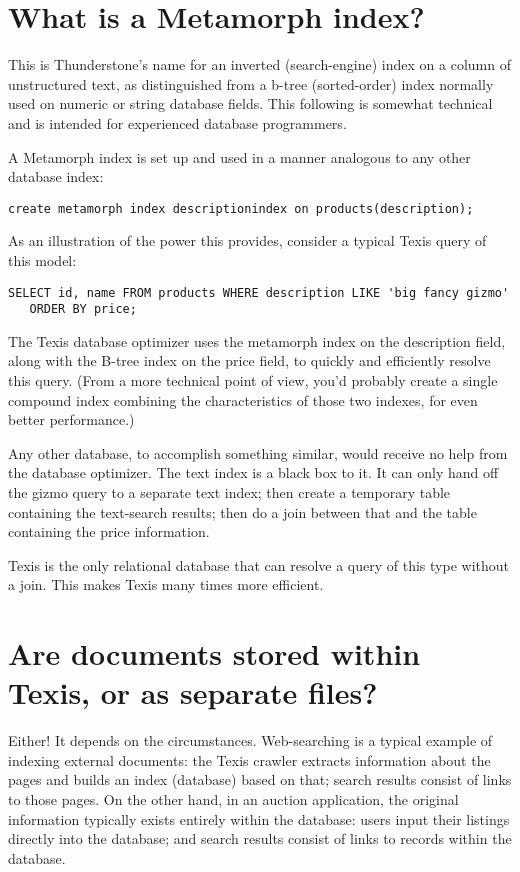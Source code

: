 \section{What is a Metamorph index? }

This is Thunderstone's name for an inverted (search-engine) index on a
column of unstructured text, as distinguished from a b-tree
(sorted-order) index normally used on numeric or string database
fields.  This following is somewhat technical and is intended for
experienced database programmers.

A Metamorph index is set up and used in a manner analogous to any
other database index:

\begin{verbatim}
create metamorph index descriptionindex on products(description);
\end{verbatim}

As an illustration of the power this provides, consider a typical
Texis query of this model:

\begin{verbatim}
SELECT id, name FROM products WHERE description LIKE 'big fancy gizmo'
   ORDER BY price;
\end{verbatim}

The Texis database optimizer uses the metamorph index on the
description field, along with the B-tree index on the price field, to
quickly and efficiently resolve this query.  (From a more technical
point of view, you'd probably create a single compound index combining
the characteristics of those two indexes, for even better
performance.)

Any other database, to accomplish something similar, would receive no
help from the database optimizer.  The text index is a black box to
it.  It can only hand off the gizmo query to a separate text index;
then create a temporary table containing the text-search results; then
do a join between that and the table containing the price information.

Texis is the only relational database that can resolve a query of this
type without a join.  This makes Texis many times more efficient.

\section{Are documents stored within Texis, or as separate files? }

Either! It depends on the circumstances. Web-searching is a typical
example of indexing external documents: the Texis crawler extracts
information about the pages and builds an index (database) based on
that; search results consist of links to those pages. On the other
hand, in an auction application, the original information typically
exists entirely within the database: users input their listings
directly into the database; and search results consist of links to
records within the database.

